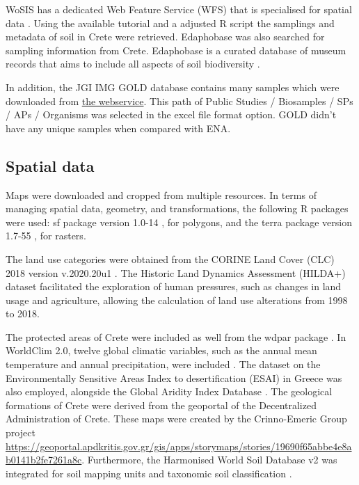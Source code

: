 WoSIS has a dedicated Web Feature Service (WFS) that is specialised for spatial data \parencite{Batjes2024}. 
Using the available tutorial and a adjusted R script the samplings and metadata of 
soil in Crete were retrieved.
Edaphobase was also searched for sampling information from Crete. Edaphobase is
a curated database of museum records that aims to include all aspects of soil biodiversity \parencite{BURKHARDT20143}.

In addition, the JGI IMG GOLD database contains many samples which were downloaded from \href{https://gold.jgi.doe.gov/downloads}{the webservice}.
This path of Public Studies / Biosamples / SPs / APs / Organisms was selected in the excel file format option. 
GOLD didn't have any unique samples when compared with ENA.

\subsection{Spatial data}\label{crete_spatial}

Maps were downloaded and cropped from multiple resources.
In terms of managing spatial data, geometry, and transformations, the following
R packages were used:
sf package version 1.0-14 \parencite{Pebesma2023}, for polygons, and the terra
package version 1.7-55 \parencite{hijmans2024terra}, for rasters.

The land use categories were obtained from the CORINE Land Cover (CLC) 2018
version v.2020.20u1 \parencite{CLC2023}.
The Historic Land Dynamics Assessment (HILDA+) dataset \parencite{winkler2021global}
facilitated the exploration of human pressures, such as changes in land usage and agriculture,
allowing the calculation of land use alterations from 1998 to 2018.

The protected areas of Crete were included as well from the wdpar package \parencite{Hanson2022}.
In WorldClim 2.0, twelve global climatic variables, such as the annual mean
temperature and annual precipitation, were included \parencite{Fick2017}.
The dataset on the Environmentally Sensitive Areas Index to desertification (ESAI)
in Greece \parencite{KARAMESOUTI2018266} was also employed, alongside the
Global Aridity Index Database \parencite{zomer2022version}.
The geological formations of Crete were derived from the geoportal of the
Decentralized Administration of Crete. These maps were created by the Crinno-Emeric Group
project \url{https://geoportal.apdkritis.gov.gr/gis/apps/storymaps/stories/19690f65abbe4e8ab0141b2fe7261a8c}.
Furthermore, the Harmonised World Soil Database v2 was integrated for soil mapping units and taxonomic soil classification \parencite{fao2023}.

